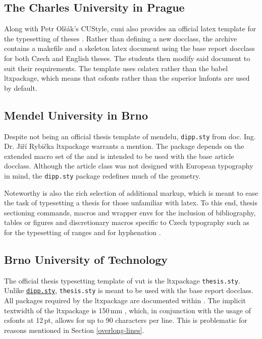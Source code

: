 \documentclass[12pt,twoside,cover,color,table]%
  {fithesis3/fithesis3/fithesis3} %
\begin{document}
  \subsection{The Charles University in Prague}
  Along with Petr Olšák's CUStyle, \gls{cuni} also provides an
  official \gls{latex} template for the typesetting of theses
  \cite{cunisablona}. Rather than defining a new \gls{docclass},
  the archive contains a \gls{makefile} and a skeleton \gls{latex}
  document using the base report \gls{docclass} for both Czech and
  English theses. The students then modify said document to suit
  their requirements. The template uses \gls{cslatex} rather than
  the babel \gls{ltxpackage}, which means that \gls{csfonts} rather
  than the superior \gls{lmfonts} \cite{cslatexvsbabel} are used by
  default.

  \subsection{Mendel University in Brno}
  \label{sec:dipp.sty}
  Despite not being an official thesis template of \gls{mendelu},
  \texttt{dipp.sty} from doc. Ing. Dr. Jiří Rybička
  \gls{ltxpackage} warrants a mention. The package depends on the
  extended macro set of the 
   and is intended to be used
  with the base article \gls{docclass}. Although the article class
  was not designed with European typography in mind, the
  \texttt{dipp.sty} package redefines much of the geometry.

  Noteworthy is also the rich selection of additional markup, which
  is meant to ease the task of typesetting a thesis for those
  unfamiliar with \gls{latex}. To this end, thesis sectioning
  commands, macros and wrapper \glspl{env} for the inclusion of
  bibliography, tables or figures and discretionary macros specific
  to Czech typography such as  for the typesetting of ranges
  and  for hyphenation
  \cite{dippman}.

  \subsection{Brno University of Technology}
  The official thesis typesetting template of \gls{vut} is the
  \gls{ltxpackage} \texttt{thesis.sty}. Unlike
  \texttt{\hyperref[sec:dipp.sty]{\tt dipp.sty}},
  \texttt{thesis.sty} is meant to be used with the base report
  \gls{docclass}. All packages required by the \gls{ltxpackage} are
  documented within \cite[p.~9]{thesis.sty-doc}\pending{}. The
  implicit \gls{textwidth} of the \gls{ltxpackage} is 150\,mm
  \cite[p.~2]{thesis.sty-doc}, which, in conjunction with the usage
  of \gls{csfonts} at 12\,pt, allows for up to 90 characters per
  line. This is problematic for reasons mentioned in Section
  \ref{overlong-lines}.
\end{document}
